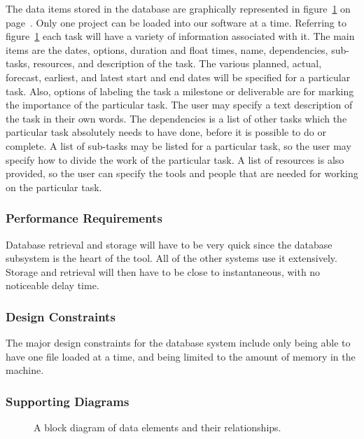 The data items stored in the database are graphically represented in
figure~\ref{dbblockdiag} on page~\pageref{dbblockdiag}. Only one
project can be loaded into our software at a time.  Referring to
figure~\ref{dbblockdiag} each task will have a variety of information
associated with it.  The main items are the dates, options, duration
and float times, name, dependencies, sub-tasks, resources, and
description of the task.  The various planned, actual, forecast,
earliest, and latest start and end dates will be specified for a
particular task.  Also, options of labeling the task a milestone or
deliverable are for marking the importance of the particular task.
The user may specify a text description of the task in their own
words.  The dependencies is a list of other tasks which the particular
task absolutely needs to have done, before it is possible to do or
complete.  A list of sub-tasks may be listed for a particular task, so
the user may specify how to divide the work of the particular task.  A
list of resources is also provided, so the user can specify the tools
and people that are needed for working on the particular task.

\subsubsection{Performance Requirements}

Database retrieval and storage will have to be very quick since the
database subsystem is the heart of the tool.  All of the other systems
use it extensively.  Storage and retrieval will then have to be close
to instantaneous, with no noticeable delay time.

\subsubsection{Design Constraints}

The major design constraints for the database system include only
being able to have one file loaded at a time, and being limited to the
amount of memory in the machine. 

\subsubsection{Supporting Diagrams}

\begin{figure}
\centering
\centerline{}
\caption[Block Diagram of Data Elements]{\label{dbblockdiag} A
block diagram of data elements and their relationships.}
\end{figure}

